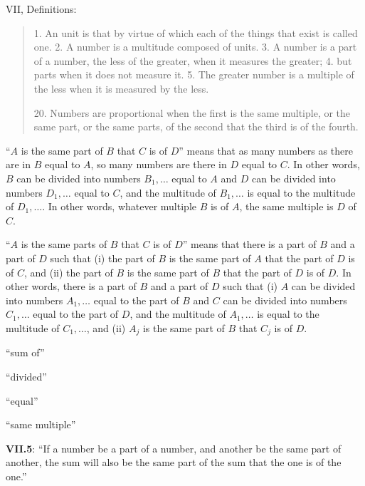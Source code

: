 \documentclass{article}
\begin{document}
VII, Definitions:

\begin{quote}
1. An unit is that by virtue of which each of the things that exist is called one.
2. A number is a multitude composed of units.
3. A number is a part of a number, the less of the
greater, when it measures the greater;
4. but parts when it does not measure it.
5. The greater number is a multiple of the less when
it is measured by the less.

20. Numbers are proportional when the first is the same multiple, or the same part, or the same parts, of the second that the third is of the fourth.
\end{quote}

``$A$ is the same part of $B$ that $C$ is of $D$'' 
means that as many numbers as there are in $B$ equal to $A$, so many numbers are there in $D$ equal to $C$.
In other words, 
$B$ can be divided into numbers $B_1,\ldots$ equal to $A$ and $D$ can be divided
into numbers $D_1,\ldots$ equal to $C$, and the multitude of  $B_1,\ldots$ is equal
to the multitude of $D_1,\ldots$.
In other words, whatever multiple $B$ is of $A$, the same multiple is $D$ of $C$.

``$A$ is the same parts of $B$ that $C$ is of $D$'' means
that there is a part of $B$ and a part of $D$ such that 
(i) the part of $B$ is the same part of $A$ that the part of $D$ is of $C$, and (ii) the part of $B$ is the same part of $B$ that the part of $D$ is of $D$.
In other words, there is a part of $B$ and a part of $D$ such that (i) $A$ can be divided into numbers
$A_1,\ldots$ equal to the part of $B$ and $C$ can be divided into numbers $C_1,\ldots$ equal to the part of $D$,
and the multitude of $A_1,\ldots$ is equal to the multitude of $C_1,\ldots$, and (ii)
 $A_j$ is the same part of $B$ that $C_j$ is of $D$.

``sum of''

``divided''

``equal''

``same multiple''

\textbf{VII.5}: ``If a number be a part of a number, and another be the same part of another, the sum will also be the same part of the sum that the one is of the one.''
\end{document}
